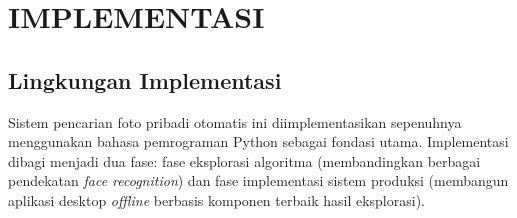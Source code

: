 \cleardoublepage
\chapter{IMPLEMENTASI}
\label{chap:implementasi}

\section{Lingkungan Implementasi}
Sistem pencarian foto pribadi otomatis ini diimplementasikan sepenuhnya menggunakan bahasa pemrograman Python sebagai fondasi utama. Implementasi dibagi menjadi dua fase: fase eksplorasi algoritma (membandingkan berbagai pendekatan \textit{face recognition}) dan fase implementasi sistem produksi (membangun aplikasi desktop \textit{offline} berbasis komponen terbaik hasil eksplorasi).

